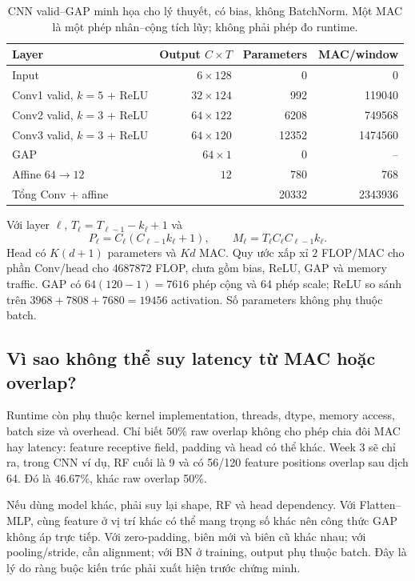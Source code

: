 \documentclass[11pt,a4paper]{article}
\theoremstyle{remark}
\begin{document}
\begin{table}[htbp]\centering\small
\caption{CNN valid--GAP minh họa cho lý thuyết, có bias, không BatchNorm.
Một MAC là một phép nhân--cộng tích lũy; không phải phép đo runtime.}
\label{tab:cnn}
\begin{tabularx}{\linewidth}{@{}Yrrr@{}}\toprule
Layer & Output $C\times T$ & Parameters & MAC/window\\\midrule
Input & $6\times128$ &0&0\\
Conv1 valid, $k=5$ + ReLU & $32\times124$ &992&119040\\
Conv2 valid, $k=3$ + ReLU & $64\times122$ &6208&749568\\
Conv3 valid, $k=3$ + ReLU & $64\times120$ &12352&1474560\\
GAP & $64\times1$ &0&--\\
Affine $64\to12$ & $12$ &780&768\\\midrule
Tổng Conv + affine & &20332&2343936\\\bottomrule
\end{tabularx}
\end{table}
Với layer $\ell$, $T_\ell=T_{\ell-1}-k_\ell+1$ và
\begin{equation}
 P_\ell=C_\ell(C_{\ell-1}k_\ell+1),\qquad
 M_\ell=T_\ell C_\ell C_{\ell-1}k_\ell.
\end{equation}
Head có $K(d+1)$ parameters và $Kd$ MAC. Quy ước xấp xỉ $2$ FLOP/MAC cho
phần Conv/head cho $4687872$ FLOP, chưa gồm bias, ReLU, GAP và memory traffic.
GAP có $64(120-1)=7616$ phép cộng và 64 phép scale; ReLU so sánh trên
$3968+7808+7680=19456$ activation. Số parameters không phụ thuộc batch.

\subsection{Vì sao không thể suy latency từ MAC hoặc overlap?}
Runtime còn phụ thuộc kernel implementation, threads, dtype, memory access,
batch size và overhead. Chỉ biết 50\% raw overlap không cho phép chia đôi
MAC hay latency: feature receptive field, padding và head có thể khác.
Week 3 sẽ chỉ ra, trong CNN ví dụ, RF cuối là 9 và có 56/120 feature
positions overlap sau dịch 64. Đó là $46.67\%$, khác raw overlap 50\%.

Nếu dùng model khác, phải suy lại shape, RF và head dependency. Với
Flatten--MLP, cùng feature ở vị trí khác có thể mang trọng số khác nên công
thức GAP không áp trực tiếp. Với zero-padding, biên mới và biên cũ khác nhau;
với pooling/stride, cần alignment; với BN ở training, output phụ thuộc batch.
Đây là lý do ràng buộc kiến trúc phải xuất hiện trước chứng minh.
\end{document}
